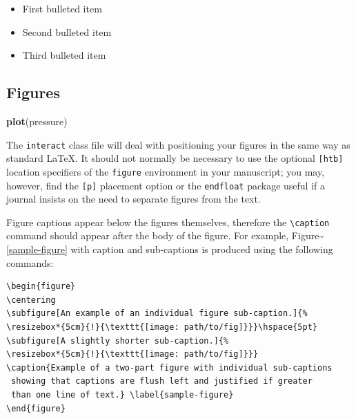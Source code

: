 \documentclass[]{interact}
\theoremstyle{plain}%
\theoremstyle{definition}
\theoremstyle{remark}
\newenvironment{Shaded}{\begin{snugshade}}{\end{snugshade}}
\newcommand{\KeywordTok}[1]{\textcolor[rgb]{0.13,0.29,0.53}{\textbf{#1}}}
\newcommand{\NormalTok}[1]{#1}
\def\tightlist{}
\begin{document}
\begin{itemize}
\tightlist
\item
  First bulleted item
\item
  Second bulleted item
\item
  Third bulleted item
\end{itemize}

\hypertarget{figures}{%
\subsection{Figures}\label{figures}}

\begin{Shaded}
\begin{Highlighting}[]
\KeywordTok{plot}\NormalTok{(pressure)}
\end{Highlighting}
\end{Shaded}

The \texttt{interact} class file will deal with positioning your figures
in the same way as standard \LaTeX. It should not normally be necessary
to use the optional \texttt{{[}htb{]}} location specifiers of the
\texttt{figure} environment in your manuscript; you may, however, find
the \texttt{{[}p{]}} placement option or the \texttt{endfloat} package
useful if a journal insists on the need to separate figures from the
text.

Figure captions appear below the figures themselves, therefore the
\texttt{\textbackslash{}caption} command should appear after the body of
the figure. For example, Figure\textasciitilde{}\ref{sample-figure} with
caption and sub-captions is produced using the following commands:

\begin{verbatim}
\begin{figure}
\centering
\subfigure[An example of an individual figure sub-caption.]{%
\resizebox*{5cm}{!}{\texttt{[image: path/to/fig]}}}\hspace{5pt}
\subfigure[A slightly shorter sub-caption.]{%
\resizebox*{5cm}{!}{\texttt{[image: path/to/fig]}}}
\caption{Example of a two-part figure with individual sub-captions
 showing that captions are flush left and justified if greater
 than one line of text.} \label{sample-figure}
\end{figure}
\end{verbatim}
\end{document}
